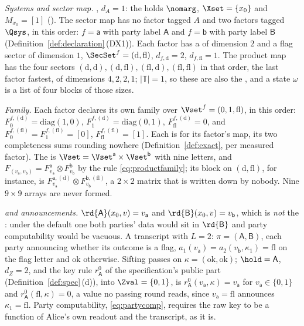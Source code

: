 \begin{example}\label{ex:two-party-shape}
\emph{Systems and sector map.}
, $d_A=1$: the
 holds $\nomarg$, $\Xset=\{x_0\}$ and $M_{x_0}=[1]$
(). The sector map has no factor tagged $A$ and two
factors tagged $\Qsys$, in this order: $f=\mathsf a$ with party label
$\mathsf A$ and $f=\mathsf b$ with party label $\mathsf B$
(Definition~\ref{def:declaration}\,(DX1)). Each factor has a  of
dimension $2$ and a flag sector of dimension $1$,
$\SecSet^{f}=(\mathrm{d},\mathrm{fl})$, $d_{f,\mathrm d}=2$,
$d_{f,\mathrm{fl}}=1$. The product map has the four sectors
$(\mathrm d,\mathrm d),(\mathrm d,\mathrm{fl}),(\mathrm{fl},\mathrm d),
(\mathrm{fl},\mathrm{fl})$ in that order, the last factor fastest, of
dimensions $4,2,2,1$; $|\mathbb{T}|=1$, so these are also the
, and a state $\omega$ is a list of four blocks of those sizes.

\emph{Family.} Each factor declares its own family over
$\Vset^{f}=(0,1,\mathrm{fl})$, in this order:
$F^{f,(\mathrm d)}_0=\mathrm{diag}(1,0)$,
$F^{f,(\mathrm d)}_1=\mathrm{diag}(0,1)$, $F^{f,(\mathrm d)}_{\mathrm{fl}}=0$,
and $F^{f,(\mathrm{fl})}_0=F^{f,(\mathrm{fl})}_1=[0]$,
$F^{f,(\mathrm{fl})}_{\mathrm{fl}}=[1]$. Each is 
for its factor's map, its two completeness sums rounding nowhere
(Definition~\ref{def:exact}, per measured factor). The  is
$\Vset=\Vset^{\mathsf a}\times\Vset^{\mathsf b}$ with nine letters, and
$F_{(v_{\mathsf a},v_{\mathsf b})}=F^{\mathsf a}_{v_{\mathsf a}}\otimes
F^{\mathsf b}_{v_{\mathsf b}}$ by the rule \eqref{eq:productfamily}; its block
on $(\mathrm d,\mathrm{fl})$, for instance, is
$F^{\mathsf a,(\mathrm d)}_{v_{\mathsf a}}\otimes
F^{\mathsf b,(\mathrm{fl})}_{v_{\mathsf b}}$, a $2\times2$ matrix that is
written down by nobody. Nine $9\times9$ arrays are never formed.

\emph{ and announcements.}
$\rd{\mathsf A}(x_0,v)=v_{\mathsf a}$ and $\rd{\mathsf B}(x_0,v)=v_{\mathsf b}$,
which is \emph{not} the : under the default one
both parties' data would sit in $\rd{\mathsf B}$ and party computability would
be vacuous. A transcript with $L=2$: $\pi=(\mathsf A,\mathsf B)$, each party
announcing whether its outcome is a flag,
$a_1(v_{\mathsf a})=a_2(v_{\mathsf b},\kappa_1)=\mathrm{fl}$ on the flag
letter and $\mathrm{ok}$ otherwise. Sifting passes on
$\kappa=(\mathrm{ok},\mathrm{ok})$; $\hold=\mathsf A$, $d_Z=2$, and the key
rule $r^{0}_{\mathsf A}$ of the specification's public part
(Definition~\ref{def:spec}\,(d)), into $\Zval=\{0,1\}$, is
$r^{0}_{\mathsf A}(v_{\mathsf a},\kappa)=v_{\mathsf a}$ for
$v_{\mathsf a}\in\{0,1\}$ and $r^{0}_{\mathsf A}(\mathrm{fl},\kappa)=0$, a
value no passing round reads, since $v_{\mathsf a}=\mathrm{fl}$ announces
$\kappa_1=\mathrm{fl}$. Party computability, \eqref{eq:partycomp}, requires
the raw key to be a function of Alice's own readout and the transcript, as it
is.


\end{example}
